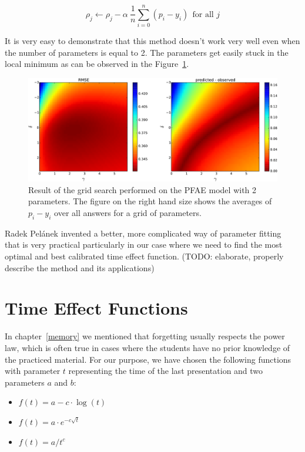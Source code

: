 \begin{equation} \label{online-learning-batch-rule}
 \rho_j \gets \rho_j - \alpha~\frac{1}{n}\sum_{i=0}^n (p_i - y_i)~~\text{for all } j
\end{equation}

It is very easy to demonstrate that this method doesn't work very well even when the number of parameters is equal to 2. The parameters get easily stuck in the local minimum as can be observed in the Figure~\ref{fig-grid-search-rmse-off}.

\begin{figure}[htbp]
  \centering
  \includegraphics[width=\textwidth]{img/pfa-grid-search-rmse-off}
  \caption{Result of the grid search performed on the PFAE model with 2 parameters. The figure on the right hand size shows the averages of $p_i - y_i$ over all answers for a grid of parameters.}
  \label{fig-grid-search-rmse-off}
\end{figure}

Radek Pelánek invented a better, more complicated way of parameter fitting~\cite{Pelanek2015} that is very practical particularly in our case where we need to find the most optimal and best calibrated time effect function. (TODO: elaborate, properly describe the method and its applications)

\section{Time Effect Functions}
\label{time-effect-functions}

In chapter~\ref{memory} we mentioned that forgetting usually respects the power law, which is often true in cases where the students have no prior knowledge of the practiced material. For our purpose, we have chosen the following functions with parameter $t$ representing the time of the last presentation and two parameters $a$ and $b$:

\begin{itemize}
  \item $f(t) = a - c \cdot \log(t)$
  \item $f(t) = a \cdot e^{-c \sqrt{t}}$
  \item $f(t) = a / t^c$
\end{itemize}

